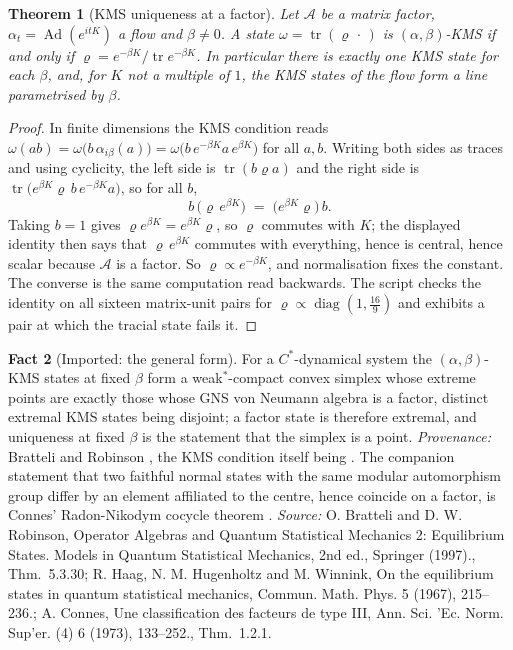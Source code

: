 \documentclass[11pt]{article}
\newtheorem{theorem}{Theorem}[section]
\theoremstyle{definition}
\newtheorem{fact}[theorem]{Fact}
\theoremstyle{plain}
\newcommand{\changedmark}[2]{\marginpar{\raggedright\scriptsize\color{#1}#2}}
\providecommand{\Aa}{}\renewcommand{\Aa}{\mathcal{A}}
\providecommand{\tr}{}\renewcommand{\tr}{\operatorname{tr}}
\begin{document}
\begin{theorem}[KMS uniqueness at a factor]\label{c:singularity.kms-uniqueness-factor}
\changedmark{BrickRed}{corrected since the deposit}
Let $\Aa$ be a matrix factor, $\alpha_t = \operatorname{Ad}(e^{itK})$ a flow and $\beta \neq 0$. A state $\omega = \tr(\varrho\,\cdot\,)$ is $(\alpha,\beta)$-KMS if and only if $\varrho = e^{-\beta K}/\tr e^{-\beta K}$. In particular there is exactly one KMS state for each $\beta$, and, for $K$ not a multiple of $1$, the KMS states of the flow form a line parametrised by $\beta$.
\end{theorem}
\begin{proof}
In finite dimensions the KMS condition reads $\omega(ab) = \omega\bigl(b\,\alpha_{i\beta}(a)\bigr) = \omega\bigl(b\,e^{-\beta K}a\,e^{\beta K}\bigr)$ for all $a, b$. Writing both sides as traces and using cyclicity, the left side is $\tr(b\varrho a)$ and the right side is $\tr\bigl(e^{\beta K}\varrho\, b\, e^{-\beta K} a\bigr)$, so for all $b$,
\[
b\,\bigl(\varrho\, e^{\beta K}\bigr) \;=\; \bigl(e^{\beta K}\varrho\bigr)\, b .
\]
Taking $b = 1$ gives $\varrho e^{\beta K} = e^{\beta K}\varrho$, so $\varrho$ commutes with $K$; the displayed identity then says that $\varrho\,e^{\beta K}$ commutes with everything, hence is central, hence scalar because $\Aa$ is a factor. So $\varrho \propto e^{-\beta K}$, and normalisation fixes the constant. The converse is the same computation read backwards. The script checks the identity on all sixteen matrix-unit pairs for $\varrho \propto \operatorname{diag}(1, \tfrac{16}{9})$ and exhibits a pair at which the tracial state fails it.

\end{proof}

\begin{fact}[Imported: the general form]\label{c:singularity.imported-general-form}
For a $C^{*}$-dynamical system the $(\alpha,\beta)$-KMS states at fixed $\beta$ form a weak$^{*}$-compact convex simplex whose extreme points are exactly those whose GNS von Neumann algebra is a factor, distinct extremal KMS states being disjoint; a factor state is therefore extremal, and uniqueness at fixed $\beta$ is the statement that the simplex is a point. \emph{Provenance:} Bratteli and Robinson \cite[Thm.~5.3.30]{BR2}, the KMS condition itself being \cite{HHW1967}. The companion statement that two faithful normal states with the same modular automorphism group differ by an element affiliated to the centre, hence coincide on a factor, is Connes' Radon-Nikodym cocycle theorem \cite[Thm.~1.2.1]{Connes1973}.
\emph{Source:} O. Bratteli and D. W. Robinson, Operator Algebras and Quantum Statistical Mechanics 2: Equilibrium States. Models in Quantum Statistical Mechanics, 2nd ed., Springer (1997)., Thm.~5.3.30; R. Haag, N. M. Hugenholtz and M. Winnink, On the equilibrium states in quantum statistical mechanics, Commun. Math. Phys. 5 (1967), 215--236.; A. Connes, Une classification des facteurs de type III, Ann. Sci. 'Ec. Norm. Sup'er. (4) 6 (1973), 133--252., Thm.~1.2.1.
\end{fact}
\end{document}
